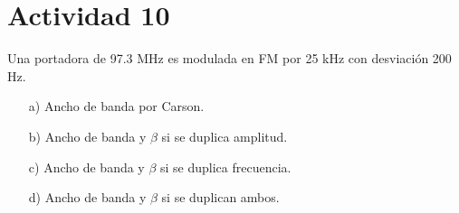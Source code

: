 \section{Actividad 10}

Una portadora de 97.3 MHz es modulada en FM por 25 kHz con desviación 200 Hz.  

\begin{itemize}
    \item[a)] Ancho de banda por Carson.  
    \item[b)] Ancho de banda y $\beta$ si se duplica amplitud.  
    \item[c)] Ancho de banda y $\beta$ si se duplica frecuencia.  
    \item[d)] Ancho de banda y $\beta$ si se duplican ambos.  
\end{itemize}